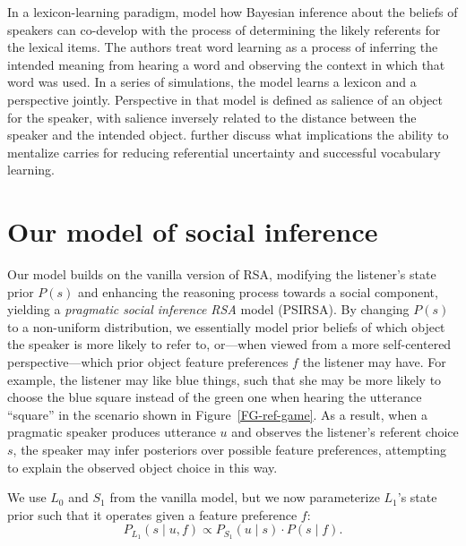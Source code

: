 \documentclass[11pt,a4paper]{article}
\begin{document}
In a lexicon-learning paradigm,  model how Bayesian inference about the beliefs of speakers can co-develop with the process of determining the likely referents for the lexical items. The authors treat word learning as a process of inferring the intended meaning from hearing a word and observing the context in which that word was used. In a series of simulations, the model learns a lexicon and a perspective jointly. Perspective in that model is defined as salience of an object for the speaker, with salience inversely related to the distance between the speaker and the intended object. \citeauthor{woensdregt2016modelling} further discuss what implications the ability to mentalize carries for reducing referential uncertainty and successful vocabulary learning.


\section{Our model of social inference} \label{socialRSA}

Our model builds on the vanilla version of RSA, modifying the listener's state prior $P(s)$ and enhancing the reasoning process towards a social component, yielding a \emph{pragmatic social inference RSA} model (PSIRSA). %
By changing $P(s)$ to a non-uniform distribution, we essentially model prior beliefs of which object the speaker is more likely to refer to, or---when viewed from a more self-centered perspective---which prior object feature preferences $f$ the listener may have. 
For example, the listener may like blue things, such that she may be more likely to choose the blue square instead of the green one when hearing the utterance ``square'' in the scenario shown in Figure~\ref{FG-ref-game}.
As a result, when a pragmatic speaker produces utterance $u$ and observes the listener's referent choice $s$, the speaker may infer posteriors over possible feature preferences, attempting to explain the observed object choice in this way.

We use $L_0$ and $S_1$ from the vanilla model, but we now parameterize $L_1$'s state prior such that it operates given a feature preference $f$:
\begin{equation}
P_{L_{1}}(s\mid u,f) \propto P_{S_{1}}(u \mid s) \cdot P(s \mid f).
\end{equation}
\end{document}
